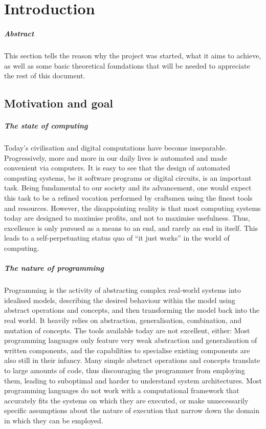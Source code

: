\chapter{Introduction}
\paragraph{Abstract}
This section tells the reason why the {\tetra} project was started, what it aims to achieve, as well as some basic theoretical foundations that will be needed to appreciate the rest of this document.

\section{Motivation and goal\optional}

\paragraph{The state of computing}
Today's civilisation and digital computations have become inseparable.
Progressively, more and more in our daily lives is automated and made convenient via computers.
It is easy to see that the design of automated computing systems, be it software programs or digital circuits, is an important task.
Being fundamental to our society and its advancement, one would expect this task to be a refined vocation performed by craftsmen using the finest tools and resources.
However, the disappointing reality is that most computing systems today are designed to maximise profits, and not to maximise usefulness.
Thus, excellence is only pursued as a means to an end, and rarely an end in itself.
This leads to a self-perpetuating status quo of ``it just works'' in the world of computing.

\paragraph{The nature of programming}
Programming is the activity of abstracting complex real-world systems into idealised models, describing the desired behaviour within the model using abstract operations and concepts, and then transforming the model back into the real world.
It heavily relies on abstraction, generalisation, combination, and mutation of concepts.
The tools available today are not excellent, either:
	Most programming languages only feature very weak abstraction and generalisation of written components, and the capabilities to specialise existing components are also still in their infancy.
	Many simple abstract operations and concepts translate to large amounts of code, thus discouraging the programmer from employing them, leading to suboptimal and harder to understand system architectures.
	Most programming languages do not work with a computational framework that accurately fits the systems on which they are executed, or make unnecessarily specific assumptions about the nature of execution that narrow down the domain in which they can be employed.


